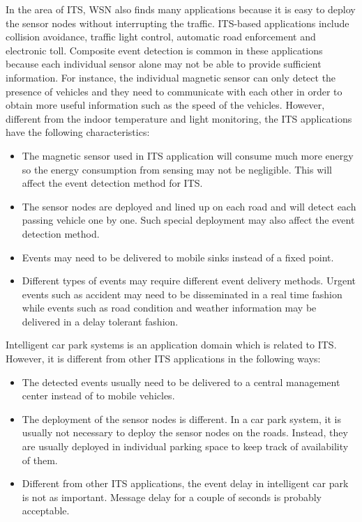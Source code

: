 In the area of ITS, WSN also finds many applications because it is easy to deploy the sensor nodes without interrupting the traffic. ITS-based applications include collision avoidance, traffic light control, automatic road enforcement and electronic toll. Composite event detection is common in these applications because each individual sensor alone may not be able to provide sufficient information. For instance, the individual magnetic sensor can only detect the presence of vehicles and they need to communicate with each other in order to obtain more useful information such as the speed of the vehicles. However, different from the indoor temperature and light monitoring, the ITS applications have the following characteristics:
\begin{itemize}
\item The magnetic sensor used in ITS application will consume much more energy so the energy consumption from sensing may not be negligible. This will affect the event detection method for ITS.
\item The sensor nodes are deployed and lined up on each road and will detect each passing vehicle one by one. Such special deployment may also affect the event detection method.
\item Events may need to be delivered to mobile sinks instead of a fixed point.
\item Different types of events may require different event delivery methods. Urgent events such as accident may need to be disseminated in a real time fashion while events such as road condition and weather information may be delivered in a delay tolerant fashion.
\end{itemize}

Intelligent car park systems is an application domain which is related to ITS. However, it is different from other ITS applications in the following ways:
\begin{itemize}
\item The detected events usually need to be delivered to a central management center instead of to mobile vehicles.
\item The deployment of the sensor nodes is different. In a car park system, it is usually not necessary to deploy the sensor nodes on the roads. Instead, they are usually deployed in individual parking space to keep track of availability of them.
\item Different from other ITS applications, the event delay in intelligent car park is not as important. Message delay for a couple of seconds is probably acceptable.
\end{itemize}

